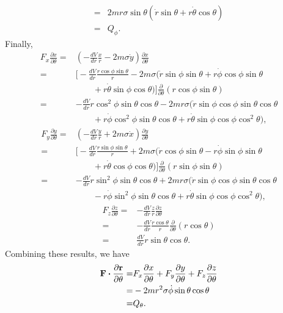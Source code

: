 \begin{questions}
\begin{solution}
\begin{parts}
\begin{align*}
=& 2 m r \sigma \sin \theta ( \dot{r} \sin \theta + r \dot{\theta} \cos \theta ) \\
=& Q_\phi.
\end{align*}
Finally,
\begin{align*}
F_x \frac{\partial x}{\partial \theta} =& \left( -\frac{dV}{dr} \frac{x}{r} - 2 m \sigma \dot{y} \right) \frac{\partial x}{\partial \theta} \\
=& \biggl[ -\frac{dV}{dr} \frac{r \cos \phi \sin \theta}{r} - 2 m \sigma ( \dot{r} \sin \phi \sin \theta + r \dot{\phi} \cos \phi \sin \theta \\
&\qquad + r \dot{\theta} \sin \phi \cos \theta ) \biggr] \frac{\partial}{\partial \theta} ( r \cos \phi \sin \theta ) \\
=& -\frac{dV}{dr} r \cos^2 \phi \sin \theta \cos \theta - 2 m 
r \sigma ( \dot{r} \sin \phi \cos \phi \sin \theta \cos \theta \\
&\qquad + r \dot{\phi} \cos^2 \phi \sin \theta \cos \theta + r \dot{\theta} \sin \phi \cos \phi \cos^2 \theta ),
\end{align*}
\begin{align*}
F_y \frac{\partial y}{\partial \theta} =& \left( -\frac{dV}{dr} \frac{y}{r} + 2 m \sigma \dot{x} \right) \frac{\partial y}{\partial \theta} \\
=& \biggl[ -\frac{dV}{dr} \frac{r \sin \phi \sin \theta}{r} + 2 m \sigma ( \dot{r} \cos \phi \sin \theta - r \dot{\phi} \sin \phi \sin \theta \\
&\qquad + r \dot{\theta} \cos \phi \cos \theta ) \biggr] \frac{\partial}{\partial \theta} ( r \sin \phi \sin \theta ) \\
=& -\frac{dV}{dr} r \sin^2 \phi \sin \theta \cos \theta + 2 m r \sigma ( \dot{r} \sin \phi \cos \phi \sin \theta \cos \theta \\
&\qquad - r \dot{\phi} \sin^2 \phi \sin \theta \cos \theta + r \dot{\theta} \sin \phi \cos \phi \cos^2 \theta ),
\end{align*}
\begin{align*}
F_z \frac{\partial z}{\partial \theta} =& -\frac{dV}{dr} \frac{z}{r} \frac{\partial z}{\partial \theta} \\
=& -\frac{dV}{dr} \frac{r \cos \theta}{r} \frac{\partial}{\partial \theta} ( r \cos \theta ) \\
=& \frac{dV}{dr} r \sin \theta \cos \theta.
\end{align*}
Combining these results, we have
\begin{align*}
\bm{\mathbf{F}} \boldsymbol{\cdot} \frac{\partial \bm{\mathbf{r}}}{\partial \theta} =& F_x \frac{\partial x}{\partial \theta} + F_y \frac{\partial y}{\partial \theta} + F_z \frac{\partial z}{\partial \theta} \\
=& -2 m r^2 \sigma \dot{\phi} \sin \theta \cos \theta \\
=& Q_\theta.
\end{align*}

\end{parts}
\end{solution}
\end{questions}
